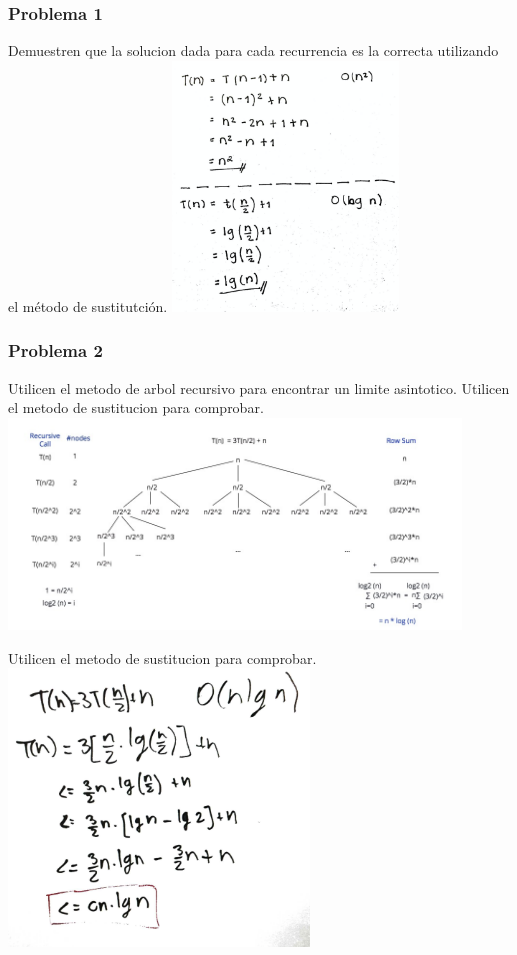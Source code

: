 \documentclass{beamer}
\begin{document}
\begin{frame}
\frametitle{Problema 1}
 Demuestren que la solucion dada para cada recurrencia es la correcta utilizando el método de sustitutción.
\includegraphics[width=6cm]{p1.png}

\end{frame}

\begin{frame}
\frametitle{Problema 2}
Utilicen el metodo de arbol recursivo para encontrar un limite asintotico. Utilicen el metodo de sustitucion para comprobar.
\includegraphics[width=12cm]{p2.jpg}

\end{frame}
\begin{frame}
 Utilicen el metodo de sustitucion para comprobar.
\includegraphics[width=8cm]{p2_2.png}

\end{frame}
\end{document}
